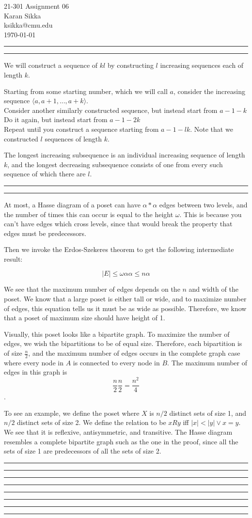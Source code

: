 \documentclass[11pt,letterpaper]{article}
\makeatletter
\newcommand{\question}[1] {\vspace{.25in} \hrule\vspace{0.5em}
\noindent{\bf #1} \vspace{0.5em}
\hrule \vspace{.10in}}
\newcommand{\myname}{Karan Sikka}
\newcommand{\myandrew}{ksikka@cmu.edu}
\newcommand{\myhwnum}{06}
\makeatother
\begin{document}
\medskip

\thispagestyle{plain}
\begin{center}                  %
{\Large 21-301 Assignment \myhwnum} \\
\myname \\
\myandrew \\
\today
\end{center}

\question{1}
We will construct a sequence of $kl$ by constructing $l$ increasing sequences each of length $k$.

Starting from some starting number, which we will call $a$, consider the increasing sequence $\langle a, a+1, ... , a + k \rangle$.\\
Consider another similarly constructed sequence, but instead start from $a - 1 - k $\\
Do it again, but instead start from $a - 1 - 2k $\\
Repeat until you construct a sequence starting from $a - 1 - lk $. Note that we constructed $l$ sequences of length $k$.

The longest increasing subsequence is an individual increasing sequence of length $k$,
and the longest decreasing subsequence consists of one from every such sequence of which there are $l$.


\question{2}
At most, a Hasse diagram of a poset can have $\alpha * \alpha$ edges between two levels,
and the number of times this can occur is equal to the height $\omega$. This is because
you can't have edges which cross levels, since that would break the property that edges must be predecessors.

Then we invoke the Erdos-Szekeres theorem to get the following intermediate result:

$$ |E| \leq \omega \alpha \alpha \leq n \alpha$$

We see that the maximum number of edges depends on the $n$ and width of the poset.
We know that a large poset is either tall or wide, and to maximize number of edges, this equation tells us it must be as wide as possible.
Therefore, we know that a poset of maximum size should have height of 1.

Visually, this poset looks like a bipartite graph. To maximize the number of edges, we wish the bipartitions to be of equal size.
Therefore, each bipartition is of size $\frac{n}{2}$, and the maximum number of edges occurs in the complete graph case where every node
in $A$ is connected to every node in $B$. The maximum number of edges in this graph is $$\frac{n}{2} \frac{n}{2} = \frac{n^2}{4}$$.

To see an example, we define the poset where $X$ is $n/2$ distinct sets of size 1, and $n/2$ distinct sets of size 2.
We define the relation to be $xRy$ iff $|x| < |y| \vee x = y$. We see that it is reflexive, antisymmetric, and transitive.
The Hasse diagram resembles a complete bipartite graph such as the one in the proof,
since all the sets of size 1 are predecessors of all the sets of size 2.

\question{3}

\question{4}

\question{5}

\question{6}
\end{document}

